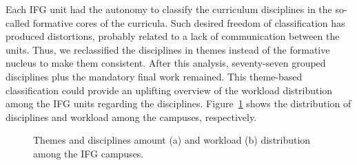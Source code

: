 \documentclass[sigconf, review]{educomp}
\begin{document}
Each IFG unit had the autonomy to classify the curriculum disciplines in the so-called formative cores of the curricula.
Such desired freedom of classification has produced distortions, probably related to a lack of communication between the units.
Thus, we reclassified the disciplines in themes instead of the formative nucleus to make them consistent.
After this analysis, seventy-seven grouped disciplines plus the mandatory final work remained.
This theme-based classification could provide an uplifting overview of the workload distribution among the IFG units regarding the disciplines.
Figure~\ref{fig_distribution} shows the distribution of disciplines and workload among the campuses, respectively.
\begin{figure}[!htbp]
    \centering
    \qquad
    \caption{Themes and disciplines amount (a) and workload (b) distribution among the IFG campuses.}%
    \label{fig_distribution}%
\end{figure}
\end{document}
